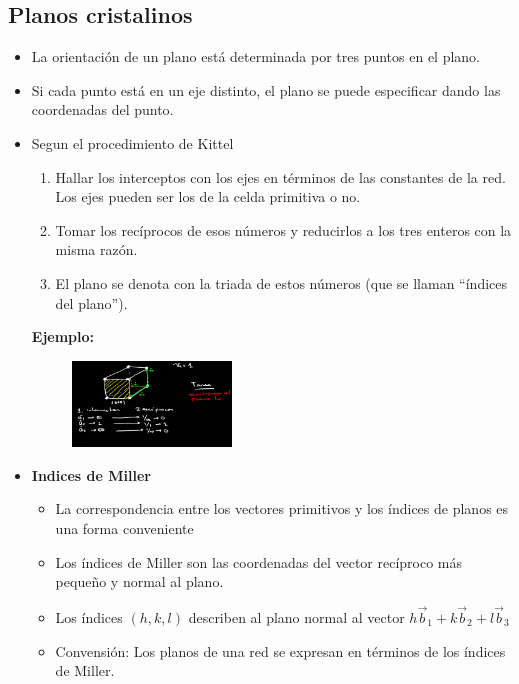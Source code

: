 \subsection{Planos cristalinos}
\begin{itemize}
    \item La orientación de un plano está determinada por tres puntos en el plano.
    \item Si cada punto está en un eje distinto, el plano se puede especificar dando las coordenadas del punto.
    \item Segun el procedimiento de Kittel
    \begin{enumerate}
        \item Hallar los interceptos con los ejes en términos de las constantes de la red. Los ejes pueden ser los de la celda primitiva o no.
        \item Tomar los recíprocos de esos números y reducirlos a los tres enteros con la misma razón.
        \item El plano se denota con la triada de estos números (que se llaman ``índices del plano'').
    \end{enumerate}
    \textbf{Ejemplo:}
    \begin{figure}[H]
        \centering
        \includegraphics[width=0.4\textwidth]{Graficas/Aug20-2.png}
    \end{figure}
    \item \textbf{Indices de Miller}
    \begin{itemize}
        \item La correspondencia entre los vectores primitivos y los índices de planos es una forma conveniente
        \item Los índices de Miller son las coordenadas del vector recíproco más pequeño y normal al plano.
        \item Los índices $(h,k,l)$ describen al plano normal al vector $h\vec{b}_1+k\vec{b}_2+l\vec{b}_3$
        \item Convensión: Los planos de una red se expresan en términos de los índices de Miller.
    \end{itemize}
\end{itemize}




